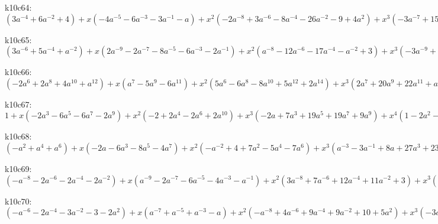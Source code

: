 k10c64: $ (3a^{-4}+6a^{-2}+4) +x(-4a^{-5}-6a^{-3}-3a^{-1}-a) +x^{2}(-2a^{-8}+3a^{-6}-8a^{-4}-26a^{-2}-9+4a^{2}) +x^{3}(-3a^{-7}+15a^{-5}+16a^{-3}+4a^{-1}+6a) +x^{4}(a^{-8}-5a^{-6}+13a^{-4}+30a^{-2}+7-4a^{2}) +x^{5}(2a^{-7}-11a^{-5}-11a^{-3}-5a^{-1}-7a) +x^{6}(3a^{-6}-8a^{-4}-18a^{-2}-6+a^{2}) +x^{7}(4a^{-5}+2a^{-3}+2a) +x^{8}(3a^{-4}+5a^{-2}+2) +x^{9}(a^{-3}+a^{-1}) $

k10c65: $ (3a^{-6}+5a^{-4}+a^{-2}) +x(2a^{-9}-2a^{-7}-8a^{-5}-6a^{-3}-2a^{-1}) +x^{2}(a^{-8}-12a^{-6}-17a^{-4}-a^{-2}+3) +x^{3}(-3a^{-9}+4a^{-7}+19a^{-5}+20a^{-3}+6a^{-1}-2a) +x^{4}(-4a^{-8}+12a^{-6}+24a^{-4}+a^{-2}-7) +x^{5}(a^{-9}-6a^{-7}-14a^{-5}-17a^{-3}-9a^{-1}+a) +x^{6}(2a^{-8}-7a^{-6}-16a^{-4}-4a^{-2}+3) +x^{7}(3a^{-7}+4a^{-5}+5a^{-3}+4a^{-1}) +x^{8}(3a^{-6}+6a^{-4}+3a^{-2}) +x^{9}(a^{-5}+a^{-3}) $

k10c66: $ (-2a^{6}+2a^{8}+4a^{10}+a^{12}) +x(a^{7}-5a^{9}-6a^{11}) +x^{2}(5a^{6}-6a^{8}-8a^{10}+5a^{12}+2a^{14}) +x^{3}(2a^{7}+20a^{9}+22a^{11}+a^{13}-3a^{15}) +x^{4}(-4a^{6}+8a^{8}+8a^{10}-13a^{12}-8a^{14}+a^{16}) +x^{5}(-5a^{7}-22a^{9}-28a^{11}-7a^{13}+4a^{15}) +x^{6}(a^{6}-8a^{8}-13a^{10}+3a^{12}+7a^{14}) +x^{7}(2a^{7}+6a^{9}+11a^{11}+7a^{13}) +x^{8}(3a^{8}+7a^{10}+4a^{12}) +x^{9}(a^{9}+a^{11}) $

k10c67: $ 1 +x(-2a^{3}-6a^{5}-6a^{7}-2a^{9}) +x^{2}(-2+2a^{4}-2a^{6}+2a^{10}) +x^{3}(-2a+7a^{3}+19a^{5}+19a^{7}+9a^{9}) +x^{4}(1-2a^{2}-a^{4}+7a^{6}+2a^{8}-3a^{10}) +x^{5}(2a-6a^{3}-19a^{5}-21a^{7}-10a^{9}) +x^{6}(3a^{2}-2a^{4}-13a^{6}-7a^{8}+a^{10}) +x^{7}(4a^{3}+6a^{5}+5a^{7}+3a^{9}) +x^{8}(3a^{4}+6a^{6}+3a^{8}) +x^{9}(a^{5}+a^{7}) $

k10c68: $ (-a^{2}+a^{4}+a^{6}) +x(-2a-6a^{3}-8a^{5}-4a^{7}) +x^{2}(-a^{-2}+4+7a^{2}-5a^{4}-7a^{6}) +x^{3}(a^{-3}-3a^{-1}+8a+27a^{3}+23a^{5}+8a^{7}) +x^{4}(3a^{-2}-10-9a^{2}+17a^{4}+13a^{6}) +x^{5}(5a^{-1}-14a-30a^{3}-16a^{5}-5a^{7}) +x^{6}(7-4a^{2}-20a^{4}-9a^{6}) +x^{7}(7a+7a^{3}+a^{5}+a^{7}) +x^{8}(4a^{2}+6a^{4}+2a^{6}) +x^{9}(a^{3}+a^{5}) $

k10c69: $ (-a^{-8}-2a^{-6}-2a^{-4}-2a^{-2}) +x(a^{-9}-2a^{-7}-6a^{-5}-4a^{-3}-a^{-1}) +x^{2}(3a^{-8}+7a^{-6}+12a^{-4}+11a^{-2}+3) +x^{3}(-2a^{-9}+5a^{-7}+23a^{-5}+22a^{-3}+5a^{-1}-a) +x^{4}(-5a^{-8}-9a^{-6}-14a^{-4}-17a^{-2}-7) +x^{5}(a^{-9}-8a^{-7}-30a^{-5}-32a^{-3}-10a^{-1}+a) +x^{6}(3a^{-8}-4a^{-4}+3a^{-2}+4) +x^{7}(5a^{-7}+13a^{-5}+14a^{-3}+6a^{-1}) +x^{8}(4a^{-6}+8a^{-4}+4a^{-2}) +x^{9}(a^{-5}+a^{-3}) $

k10c70: $ (-a^{-6}-2a^{-4}-3a^{-2}-3-2a^{2}) +x(a^{-7}+a^{-5}+a^{-3}-a) +x^{2}(-a^{-8}+4a^{-6}+9a^{-4}+9a^{-2}+10+5a^{2}) +x^{3}(-3a^{-7}+2a^{-3}+4a^{-1}+5a) +x^{4}(a^{-8}-6a^{-6}-12a^{-4}-8a^{-2}-7-4a^{2}) +x^{5}(3a^{-7}-4a^{-5}-11a^{-3}-10a^{-1}-6a) +x^{6}(5a^{-6}+3a^{-4}-5a^{-2}-2+a^{2}) +x^{7}(5a^{-5}+6a^{-3}+3a^{-1}+2a) +x^{8}(3a^{-4}+5a^{-2}+2) +x^{9}(a^{-3}+a^{-1}) $

